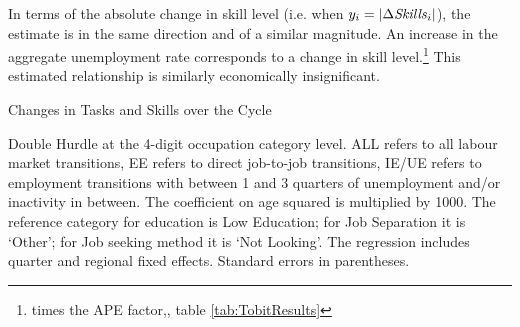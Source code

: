 \documentclass[12pt,authoryear]{elsarticle}
\begin{document}
	\vspace{2mm}
	
	In terms of the absolute change in skill level (i.e. when $y_i=|\Delta\text{\textit{Skills}}_{i}|$), the estimate is in the same direction and of a similar magnitude. An increase in the aggregate unemployment rate corresponds to a  change in skill level.\footnote{ times the APE factor,\hspace{-1mm}, table \ref{tab:TobitResults}} This estimated relationship is similarly economically insignificant.
	\newpage
	\thispagestyle{empty}
	\begin{table}[htbp]
		\centering
		\caption{Changes in Tasks and Skills over the Cycle}\label{tab:TobitResults}
		\begin{adjustbox}{width=\textwidth}
			\begin{threeparttable}
				
				
				\begin{tablenotes}
					\item{\footnotesize{Double Hurdle at the 4-digit occupation category level. ALL refers to all labour market transitions, EE refers to direct job-to-job transitions, IE/UE refers to employment transitions with between 1 and 3 quarters of unemployment and/or inactivity in between. The coefficient on age squared is multiplied by 1000. The reference category for education is Low Education; for Job Separation it is `Other';  for Job seeking method it is `Not Looking'. The regression includes quarter and regional fixed effects. Standard errors in parentheses.}}
				\end{tablenotes}
			\end{threeparttable}
		\end{adjustbox}
	\end{table}
	\restoregeometry %
	\newpage
	
\end{document}
